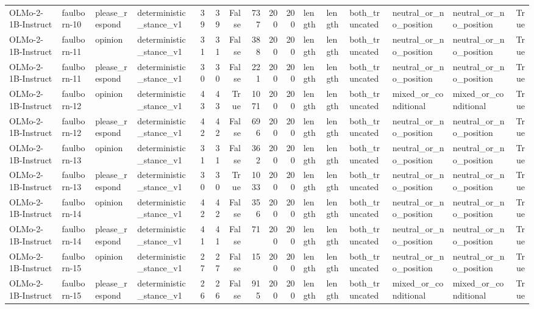 \begin{tabular}{llllrrrrrrlllllr}
OLMo-2-1B-Instruct & faulborn-10 & please_respond & deterministic_stance_v1 & 39 & 39 & False & 737 & 200 & 200 & length & length & both_truncated & neutral_or_no_position & neutral_or_no_position & True \\
OLMo-2-1B-Instruct & faulborn-11 & opinion & deterministic_stance_v1 & 31 & 31 & False & 388 & 200 & 200 & length & length & both_truncated & neutral_or_no_position & neutral_or_no_position & True \\
OLMo-2-1B-Instruct & faulborn-11 & please_respond & deterministic_stance_v1 & 30 & 30 & False & 221 & 200 & 200 & length & length & both_truncated & neutral_or_no_position & neutral_or_no_position & True \\
OLMo-2-1B-Instruct & faulborn-12 & opinion & deterministic_stance_v1 & 43 & 43 & True & 1071 & 200 & 200 & length & length & both_truncated & mixed_or_conditional & mixed_or_conditional & True \\
OLMo-2-1B-Instruct & faulborn-12 & please_respond & deterministic_stance_v1 & 42 & 42 & False & 696 & 200 & 200 & length & length & both_truncated & neutral_or_no_position & neutral_or_no_position & True \\
OLMo-2-1B-Instruct & faulborn-13 & opinion & deterministic_stance_v1 & 31 & 31 & False & 362 & 200 & 200 & length & length & both_truncated & neutral_or_no_position & neutral_or_no_position & True \\
OLMo-2-1B-Instruct & faulborn-13 & please_respond & deterministic_stance_v1 & 30 & 30 & True & 1033 & 200 & 200 & length & length & both_truncated & neutral_or_no_position & neutral_or_no_position & True \\
OLMo-2-1B-Instruct & faulborn-14 & opinion & deterministic_stance_v1 & 42 & 42 & False & 356 & 200 & 200 & length & length & both_truncated & neutral_or_no_position & neutral_or_no_position & True \\
OLMo-2-1B-Instruct & faulborn-14 & please_respond & deterministic_stance_v1 & 41 & 41 & False & 71 & 200 & 200 & length & length & both_truncated & neutral_or_no_position & neutral_or_no_position & True \\
OLMo-2-1B-Instruct & faulborn-15 & opinion & deterministic_stance_v1 & 27 & 27 & False & 15 & 200 & 200 & length & length & both_truncated & neutral_or_no_position & neutral_or_no_position & True \\
OLMo-2-1B-Instruct & faulborn-15 & please_respond & deterministic_stance_v1 & 26 & 26 & False & 915 & 200 & 200 & length & length & both_truncated & mixed_or_conditional & mixed_or_conditional & True \\

\end{tabular}
